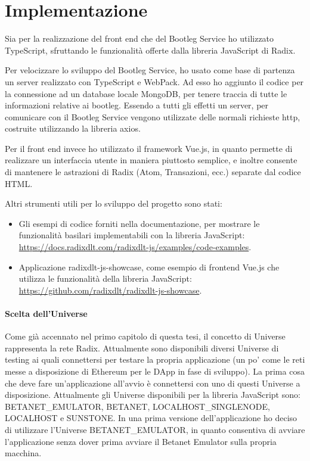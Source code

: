 \chapter{Implementazione}
Sia per la realizzazione del front end che del Bootleg Service ho utilizzato TypeScript, sfruttando le funzionalità offerte dalla libreria JavaScript di Radix. 

Per velocizzare lo sviluppo del Bootleg Service, ho usato come base di partenza un server realizzato con TypeScript e WebPack. Ad esso ho aggiunto il codice per la connessione ad un database locale MongoDB, per tenere traccia di tutte le informazioni relative ai bootleg. Essendo a tutti gli effetti un server, per comunicare con il Bootleg Service vengono utilizzate delle normali richieste http, costruite utilizzando la libreria axios.

Per il front end invece ho utilizzato il framework Vue.js, in quanto permette di realizzare un interfaccia utente in maniera piuttosto semplice, e inoltre consente di mantenere le astrazioni di Radix (Atom, Transazioni, ecc.) separate dal codice HTML.

Altri strumenti utili per lo sviluppo del progetto sono stati:
\begin{itemize}
    \item Gli esempi di codice forniti nella documentazione, per mostrare le funzionalità basilari implementabili con la libreria JavaScript: \url{https://docs.radixdlt.com/radixdlt-js/examples/code-examples}.
    \item Applicazione radixdlt-js-showcase, come esempio di frontend Vue.js che utilizza le funzionalità della libreria JavaScript: \url{https://github.com/radixdlt/radixdlt-js-showcase}. 
\end{itemize}

\subsubsection{Scelta dell'Universe}

Come già accennato nel primo capitolo di questa tesi, il concetto di Universe rappresenta la rete Radix. Attualmente sono disponibili diversi Universe di testing ai quali connettersi per testare la propria applicazione (un po' come le reti messe a disposizione di Ethereum per le DApp in fase di sviluppo). La prima cosa che deve fare un'applicazione all'avvio è connettersi con uno di questi Universe a disposizione. Attualmente gli Universe disponibili per la libreria JavaScript sono: BETANET\_EMULATOR, BETANET, LOCALHOST\_SINGLENODE, LOCALHOST e SUNSTONE. In una prima versione dell'applicazione ho deciso di utilizzare l'Universe BETANET\_EMULATOR, in quanto consentiva di avviare l'applicazione senza dover prima avviare il Betanet Emulator sulla propria macchina. 

